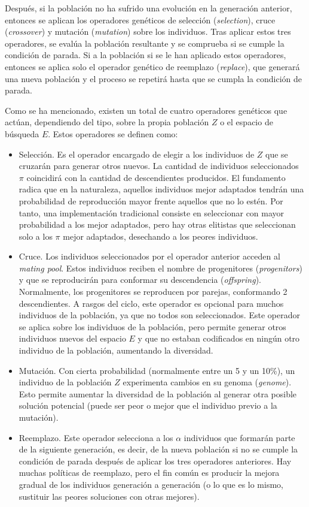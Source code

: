 \documentclass[spanish,a4paper,12pt,twoside]{report}
\begin{document}
  Después, si la población no ha sufrido una evolución en la generación anterior, entonces se aplican los operadores genéticos de selección (\emph{selection}), cruce (\emph{crossover}) y mutación (\emph{mutation}) sobre los individuos. Tras aplicar estos tres operadores, se evalúa la población resultante y se comprueba si se cumple la condición de parada. Si a la población si se le han aplicado estos operadores, entonces se aplica solo el operador genético de reemplazo (\emph{replace}), que generará una nueva población y el proceso se repetirá hasta que se cumpla la condición de parada. \par
  Como se ha mencionado, existen un total de cuatro operadores genéticos que actúan, dependiendo del tipo, sobre la propia población $Z$ o el espacio de búsqueda $E$. Estos operadores se definen como:
  \begin{itemize}
    \item Selección. Es el operador encargado de elegir a los individuos de $Z$ que se cruzarán para generar otros nuevos. La cantidad de individuos seleccionados $\pi$ coincidirá con la cantidad de descendientes producidos. El fundamento radica que en la naturaleza, aquellos individuos mejor adaptados tendrán una probabilidad de reproducción mayor frente aquellos que no lo estén. Por tanto, una implementación tradicional consiste en seleccionar con mayor probabilidad a los mejor adaptados, pero hay otras elitistas que seleccionan solo a los $\pi$ mejor adaptados, desechando a los peores individuos.
    \item Cruce. Los individuos seleccionados por el operador anterior acceden al \emph{mating pool}. Estos individuos reciben el nombre de progenitores (\emph{progenitors}) y que se reproducirán para conformar su descendencia (\emph{offspring}). Normalmente, los progenitores se reproducen por parejas, conformando 2 descendientes. A rasgos del ciclo, este operador es opcional para muchos individuos de la población, ya que no todos son seleccionados. Este operador se aplica sobre los individuos de la población, pero permite generar otros individuos nuevos del espacio $E$ y que no estaban codificados en ningún otro individuo de la población, aumentando la diversidad.
    \item Mutación. Con cierta probabilidad (normalmente entre un 5 y un 10\%), un individuo de la población $Z$ experimenta cambios en su genoma (\emph{genome}). Esto permite aumentar la diversidad de la población al generar otra posible solución potencial (puede ser peor o mejor que el individuo previo a la mutación).
    \item Reemplazo. Este operador selecciona a los $\alpha$ individuos que formarán parte de la siguiente generación, es decir, de la nueva población si no se cumple la condición de parada después de aplicar los tres operadores anteriores. Hay muchas políticas de reemplazo, pero el fin común es producir la mejora gradual de los individuos generación a generación (o lo que es lo mismo, sustituir las peores soluciones con otras mejores).
  \end{itemize} \par
\end{document}
